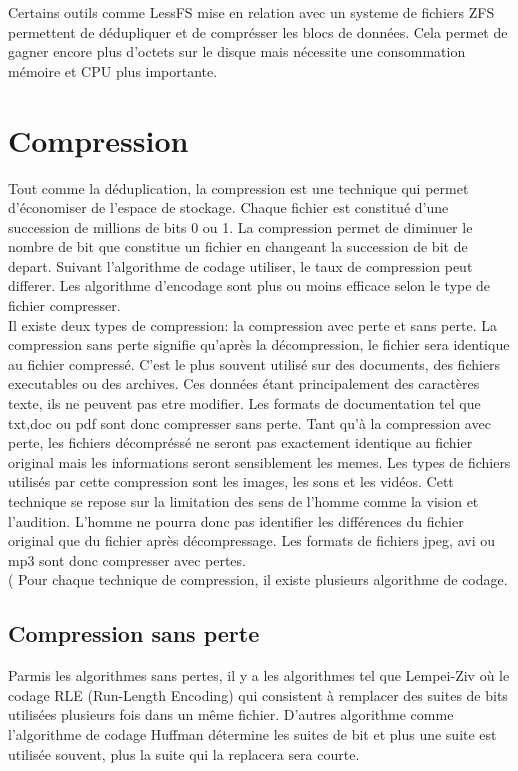 \documentclass[a4paper]{report}
\begin{document}
Certains outils comme LessFS mise en relation avec un systeme de fichiers ZFS permettent de dédupliquer et de comprésser les blocs de données. Cela permet de gagner encore plus d'octets sur le disque mais nécessite une consommation mémoire et CPU plus importante.

	\chapter*{Compression}
	Tout comme la déduplication, la compression est une technique qui permet d'économiser de l'espace de stockage. Chaque fichier est constitué d'une succession de millions de bits 0 ou 1. La compression permet de diminuer le nombre de bit que constitue un fichier en changeant la succession de bit de depart. Suivant l'algorithme de codage utiliser, le taux de compression peut differer. Les algorithme d'encodage sont plus ou moins efficace selon le type de fichier compresser.\\
 Il existe deux types de compression: la compression avec perte et sans perte. La compression sans perte signifie qu'après la décompression, le fichier sera identique au fichier compressé. C'est le plus souvent utilisé sur des documents, des fichiers executables ou des archives. Ces données étant principalement des caractères texte, ils ne peuvent pas etre modifier. Les formats de documentation tel que txt,doc ou pdf sont donc compresser sans perte.  Tant qu'à la compression avec perte, les fichiers décompréssé ne seront pas exactement identique au fichier original mais les informations seront sensiblement les memes. Les types de fichiers utilisés par cette compression sont les images, les sons et les vidéos. Cett technique se repose sur la limitation des sens de l'homme comme la vision et l'audition. L'homme ne pourra donc pas identifier les différences du fichier original que du fichier après décompressage. Les formats de fichiers jpeg, avi ou mp3 sont donc compresser avec pertes. \\(
Pour chaque technique de compression, il existe plusieurs algorithme de codage.\\
	\section{Compression sans perte}
	Parmis les algorithmes sans pertes, il y a les algorithmes tel que Lempei-Ziv où le codage RLE (Run-Length Encoding) qui consistent à remplacer des suites de bits utilisées plusieurs fois dans un même fichier. D'autres algorithme comme l'algorithme de codage Huffman détermine les suites de bit et plus une suite est utilisée souvent, plus la suite qui la replacera sera courte.
\end{document}
